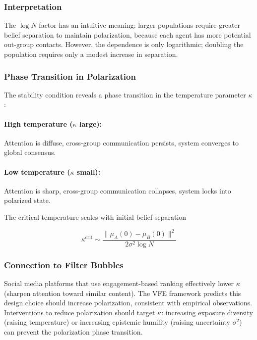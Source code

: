 \documentclass[12pt]{article}
\begin{document}
\subsubsection{Interpretation}

The $\log N$ factor has an intuitive meaning: larger populations require 
greater belief separation to maintain polarization, because each agent 
has more potential out-group contacts. However, the dependence is only 
logarithmic; doubling the population requires only a modest increase in 
separation.

\subsubsection{Phase Transition in Polarization}

The stability condition reveals a phase transition in the temperature parameter $\kappa$:

\paragraph{High temperature ($\kappa$ large):} Attention is diffuse, cross-group communication persists, system converges to global consensus.

\paragraph{Low temperature ($\kappa$ small):} Attention is sharp, cross-group communication collapses, system locks into polarized state.

The critical temperature scales with initial belief separation

\begin{equation}
\kappa^{\text{crit}} \sim \frac{\|\mu_A(0) - \mu_B(0)\|^2}{2\sigma^2 \log N}
\end{equation}

\subsubsection{Connection to Filter Bubbles}

Social media platforms that use engagement-based ranking effectively lower $\kappa$ (sharpen attention toward similar content). The VFE framework predicts this design choice should increase polarization, consistent with empirical observations. Interventions to reduce polarization should target $\kappa$: increasing exposure diversity (raising temperature) or increasing epistemic humility (raising uncertainty $\sigma^2$) can prevent the polarization phase transition.
\end{document}
